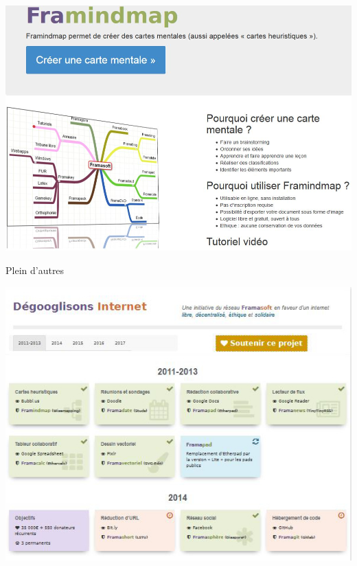 \documentclass{beamer}
\begin{document}
\begin{frame}
\begin{center}
\includegraphics[scale=0.4]{./images/Framindmap.jpg}
\end{center}
\end{frame}

\begin{frame}
\Huge{\centerline{Plein d'autres}}
\end{frame}

\begin{frame}
\begin{center}
\includegraphics[scale=0.5]{./images/Roadmap.jpg}
\end{center}
\end{frame}
\end{document}
